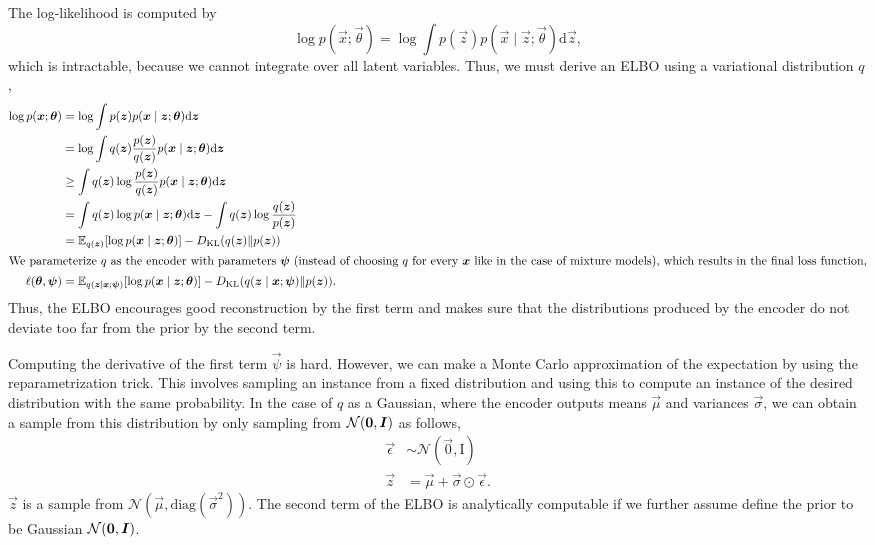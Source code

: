 The log-likelihood is computed by \[
    \log p(\vec{x}; \vec{\theta}) = \log \int p(\vec{z}) p(\vec{x} \mid \vec{z}; \vec{\theta}) \mathrm{d}\vec{z},
\]
which is intractable, because we cannot integrate over all latent variables. Thus, we must derive
an ELBO using a variational distribution $q$,
\begin{align*}
    \log p(\bm{x}; \bm{\theta})  & = \log \int p(\bm{z}) p(\bm{x} \mid \bm{z}; \bm{\theta}) \mathrm{d}\bm{z}                                                                               \\
                                   & = \log \int q(\bm{z}) \frac{p(\bm{z})}{q(\bm{z})} p(\bm{x} \mid \bm{z}; \bm{\theta}) \mathrm{d}\bm{z}                                                 \\
                                   & \geq \int q(\bm{z}) \log \frac{p(\bm{z})}{q(\bm{z})} p(\bm{x} \mid \bm{z}; \bm{\theta}) \mathrm{d}\bm{z}                                              \\
                                   & = \int q(\bm{z}) \log p(\bm{x} \mid \bm{z}; \bm{\theta}) \mathrm{d}\bm{z} - \int q(\bm{z}) \log \frac{q(\bm{z})}{p(\bm{z})}                          \\
                                   & = \mathbb{E}_{q(\bm{z})}[\log p(\bm{x} \mid \bm{z}; \bm{\theta})] - D_{\mathrm{KL}}(q(\bm{z}) \| p(\bm{z}))                                                    \\
    \intertext{We parameterize $q$ as the encoder with parameters $\bm{\psi}$ (instead of choosing $q$ for every $\bm{x}$ like in the case of mixture models), which results in the final loss function,}
    \ell(\bm{\theta}, \bm{\psi}) & = \mathbb{E}_{q(\bm{z} \mid \bm{x}; \bm{\psi})}[\log p(\bm{x} \mid \bm{z}; \bm{\theta})] - D_{\mathrm{KL}}(q(\bm{z} \mid \bm{x}; \bm{\psi}) \| p(\bm{z})).
\end{align*}
Thus, the ELBO encourages good reconstruction by the first term and makes sure that the distributions
produced by the encoder do not deviate too far from the prior by the second term.

Computing the derivative of the first term \wrt $\vec{\psi}$ is hard. However, we can make a Monte
Carlo approximation of the expectation by using the reparametrization trick. This involves sampling
an instance from a fixed distribution and using this to compute an instance of the desired
distribution with the same probability. In the case of $q$ as a Gaussian, where the encoder outputs
means $\vec{\mu}$ and variances $\vec{\sigma}$, we can obtain a sample from this distribution by
only sampling from $\mathcal{N}(\bm{0}, \bm{I})$ as follows,
\begin{align*}
    \vec{\epsilon} & \sim \mathcal{N}(\vec{0}, \mathrm{I})            \\
    \vec{z}        & = \vec{\mu} + \vec{\sigma} \odot \vec{\epsilon}.
\end{align*}
$\vec{z}$ is a sample from $\mathcal{N}(\vec{\mu}, \mathrm{diag}(\vec{\sigma}^2))$. The second term
of the ELBO is analytically computable if we further assume define the prior to be Gaussian
$\mathcal{N}(\bm{0}, \bm{I})$.

